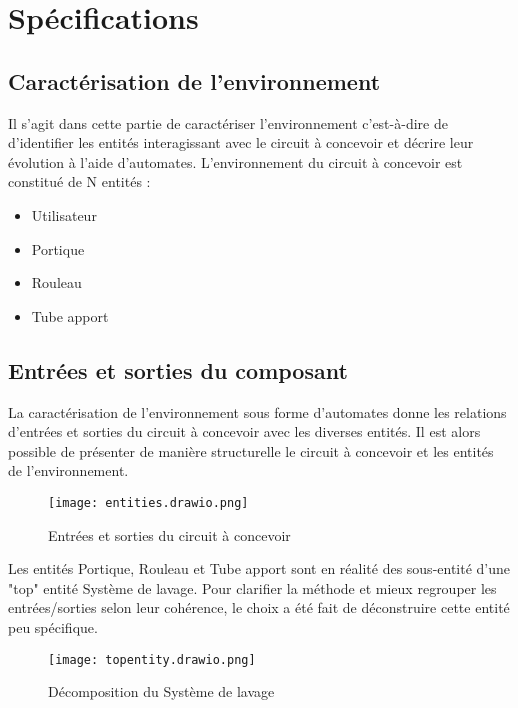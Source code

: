 \section{Spécifications}

\subsection{Caractérisation de l'environnement}

Il s'agit dans cette partie de caractériser l'environnement c'est-à-dire de d'identifier les entités interagissant avec le circuit à concevoir et décrire leur évolution à l'aide d'automates.
L'environnement du circuit à concevoir est constitué de N entités :

\begin{itemize}
	\item Utilisateur
	\item Portique
	\item Rouleau
	\item Tube apport
	
\end{itemize}

\subsection{Entrées et sorties du composant}

La caractérisation de l'environnement sous forme d'automates donne les relations d'entrées et sorties du circuit à concevoir avec les diverses entités.
Il est alors possible de présenter de manière structurelle le circuit à concevoir et les entités de l'environnement.

\begin{figure}[H]
	\centering
	\texttt{[image: entities.drawio.png]}
	\caption{Entrées et sorties du circuit à concevoir}
	\label{fig:entrees_sorties_composant}
\end{figure}

Les entités Portique, Rouleau et Tube apport sont en réalité des sous-entité d'une "top" entité Système de lavage.
Pour clarifier la méthode et mieux regrouper les entrées/sorties selon leur cohérence, le choix a été fait de déconstruire cette entité peu spécifique.

\begin{figure}[H]
	\centering
	\texttt{[image: topentity.drawio.png]}
	\caption{Décomposition du Système de lavage}
	\label{fig:decomp_entities}
\end{figure}

